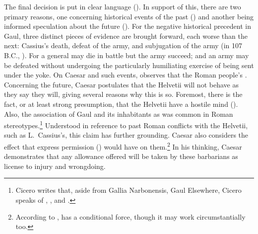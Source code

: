 \documentclass[12pt,letterpaper,oneside,final]{memoir}
\begin{document}
\begin{latin}
\begin{enumerate}
\end{enumerate} \DoubleSpacing \end{latin} The final decision is put in clear language (). In support of this, there are two primary reasons, one concerning historical events of the past () and another being informed speculation about the future (). For the negative historical precedent in Gaul, three distinct pieces of evidence are brought forward, each worse than the next: Cassius's death, defeat of the army, and subjugation of the army (in 107 B.C., \cite{kranerdittenbergermeusel1967}). For a general may die in battle but the army succeed; and an army may be defeated without undergoing the particularly humiliating exercise of being sent under the yoke. On Caesar and such events, \textcite{kraus2009} observes that the Roman people's . Concerning the future, Caesar postulates that the Helvetii will not behave as they say they will, giving several reasons why this is so. Foremost, there is the fact, or at least strong presumption, that the Helvetii have a hostile mind (). Also, the association of Gaul and its inhabitants as  was common in Roman stereotypes.\footnote{Cicero writes that, aside from Gallia Narbonensis, Gaul  Elsewhere, Cicero speaks of , , and .} Understood in reference to past Roman conflicts with the Helvetii, such as L.~Cassius's, this claim has further grounding. Caesar also considers the effect that express permission () would have on them.\footnote{According to \textcite{kranerdittenbergermeusel1967},  has a conditional force, though it may work circumstantially too.} In his thinking, Caesar demonstrates that any allowance offered will be taken by these barbarians as license to injury and wrongdoing.
\end{document}
